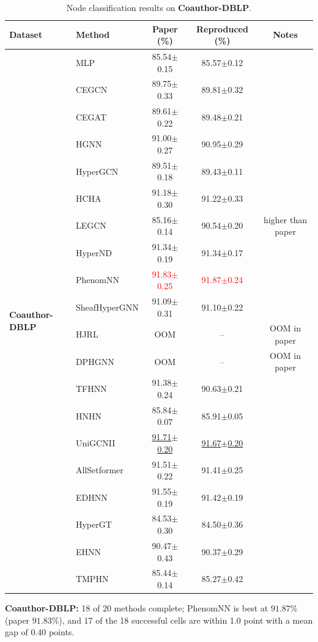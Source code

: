 \documentclass[11pt,a4paper]{article}
\begin{document}
\begin{table}[H]
	\centering\small
	\begin{tabular}{llccc}
		\toprule
		Dataset & Method & Paper (\%) & Reproduced (\%) & Notes \\
		\midrule
		\multirow{20}{*}{\textbf{Coauthor-DBLP}} & MLP               & 85.54$\pm$0.15   & 85.57$\pm$0.12   &  \\
		 & CEGCN             & 89.75$\pm$0.33   & 89.81$\pm$0.32   &  \\
		 & CEGAT             & 89.61$\pm$0.22   & 89.48$\pm$0.21   &  \\
		 & HGNN              & 91.00$\pm$0.27   & 90.95$\pm$0.29   &  \\
		 & HyperGCN          & 89.51$\pm$0.18   & 89.43$\pm$0.11   &  \\
		 & HCHA              & 91.18$\pm$0.30   & 91.22$\pm$0.33   &  \\
		 & LEGCN             & 85.16$\pm$0.14   & 90.54$\pm$0.20   & higher than paper \\
		 & HyperND           & 91.34$\pm$0.19   & 91.34$\pm$0.17   &  \\
		 & PhenomNN          & \textcolor{red}{91.83$\pm$0.25}   & \textcolor{red}{91.87$\pm$0.24}   &  \\
		 & SheafHyperGNN     & 91.09$\pm$0.31   & 91.10$\pm$0.22   &  \\
		 & HJRL              & OOM              & --               & OOM in paper \\
		 & DPHGNN            & OOM              & --               & OOM in paper \\
		 & TFHNN             & 91.38$\pm$0.24   & 90.63$\pm$0.21   &  \\
		 & HNHN              & 85.84$\pm$0.07   & 85.91$\pm$0.05   &  \\
		 & UniGCNII          & \underline{91.71$\pm$0.20}   & \underline{91.67$\pm$0.20}   &  \\
		 & AllSetformer      & 91.51$\pm$0.22   & 91.41$\pm$0.25   &  \\
		 & EDHNN             & 91.55$\pm$0.19   & 91.42$\pm$0.19   &  \\
		 & HyperGT           & 84.53$\pm$0.30   & 84.50$\pm$0.36   &  \\
		 & EHNN              & 90.47$\pm$0.43   & 90.37$\pm$0.29   &  \\
		 & TMPHN             & 85.44$\pm$0.14   & 85.27$\pm$0.42   &  \\
		\bottomrule
	\end{tabular}
	\caption{Node classification results on \textbf{Coauthor-DBLP}.}
\end{table}
\par\smallskip
\noindent\textbf{Coauthor-DBLP:} 18 of 20 methods complete; PhenomNN is best at $91.87\%$ (paper $91.83\%$), and 17 of the 18 successful cells are within 1.0 point with a mean gap of 0.40 points.
\end{document}
